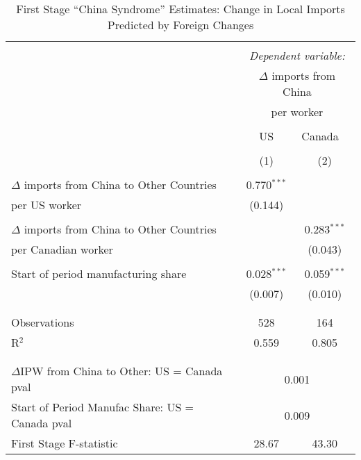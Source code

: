

\begin{table}[!htbp] \centering 
  \caption{First Stage ``China Syndrome'' Estimates: Change in Local Imports Predicted by Foreign Changes} 
  \label{tab:china_first} 
\begin{threeparttable}
\begin{tabular}{@{\extracolsep{5pt}}lcc} 
\\[-1.8ex]\hline 
\hline \\[-1.8ex] 
 & \multicolumn{2}{c}{\textit{Dependent variable:}} \\ 
& \multicolumn{2}{c}{$\Delta$ imports from China } \\ 
& \multicolumn{2}{c}{per worker} \\
\cline{2-3} 
\\[-1.8ex] &  US & Canada \ \\ 
\\[-1.8ex] & (1) & (2)\\ 
\hline \\[-1.8ex] 
 $\Delta$ imports from China to Other Countries & 0.770$^{***}$ &  \\ 
per US worker  & (0.144) &  \\ 
  & & \\ 
 $\Delta$ imports from China to Other Countries  &  & 0.283$^{***}$ \\ 
per Canadian worker  &  & (0.043) \\ 
  & & \\ 
 Start of period manufacturing share & 0.028$^{***}$ & 0.059$^{***}$ \\ 
  & (0.007) & (0.010) \\ 
  & & \\ 
\hline \\[-1.8ex] 
Observations & 528 & 164 \\ 
R$^{2}$ & 0.559 & 0.805 \\ 
\\[-1.8ex]  \hline \\[-1.8ex]
$\Delta$IPW from China to Other: US = Canada pval & \multicolumn{2}{c}{0.001} \\
Start of Period Manufac Share: US = Canada pval & \multicolumn{2}{c}{0.009} \\
First Stage F-statistic & 28.67 & 43.30 \\

\end{tabular}
\end{threeparttable}
\end{table}
